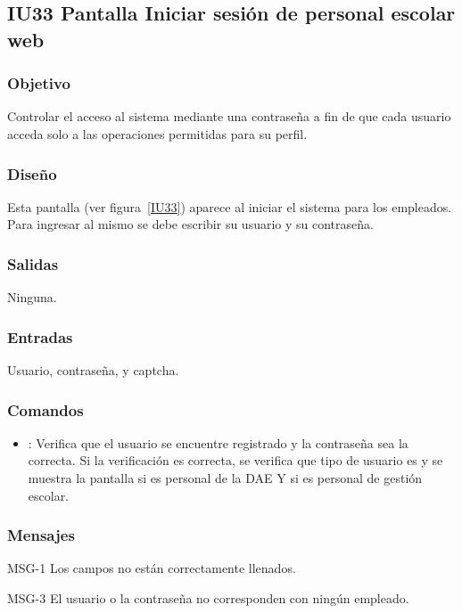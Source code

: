 \subsection{IU33 Pantalla Iniciar sesión de personal escolar web}

\subsubsection{Objetivo}
	Controlar el acceso al sistema mediante una contraseña a fin de que cada usuario acceda solo a las operaciones permitidas para su perfil.

\subsubsection{Diseño}
	Esta pantalla  (ver figura~\ref{IU33}) aparece al iniciar el sistema para los empleados. Para ingresar al mismo se debe escribir su usuario y su contraseña. 


\subsubsection{Salidas}

	Ninguna.

\subsubsection{Entradas}
	Usuario, contraseña, y captcha.

\subsubsection{Comandos}
\begin{itemize}
	\item {}: Verifica que el usuario se encuentre registrado y la contraseña sea la correcta. Si la verificación es correcta, se verifica que tipo de usuario es y se muestra la pantalla  si es personal de la DAE Y  si es personal de gestión escolar.
	
\end{itemize}

\subsubsection{Mensajes}

\begin{Citemize}
	\item MSG-1 Los campos no están correctamente llenados. 
	\item MSG-3 El usuario o la contraseña no corresponden con ningún empleado. 
\end{Citemize}

